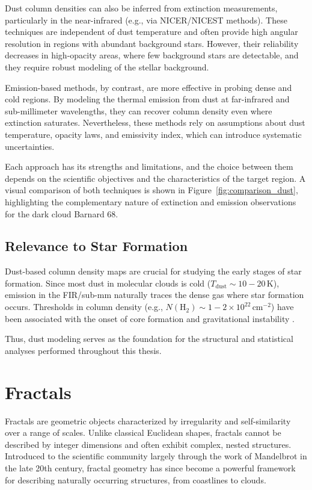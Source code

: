 Dust column densities can also be inferred from extinction measurements, particularly in the near-infrared (e.g., via NICER/NICEST methods). These techniques are independent of dust temperature and often provide high angular resolution in regions with abundant background stars. However, their reliability decreases in high-opacity areas, where few background stars are detectable, and they require robust modeling of the stellar background.

Emission-based methods, by contrast, are more effective in probing dense and cold regions. By modeling the thermal emission from dust at far-infrared and sub-millimeter wavelengths, they can recover column density even where extinction saturates. Nevertheless, these methods rely on assumptions about dust temperature, opacity laws, and emissivity index, which can introduce systematic uncertainties.

Each approach has its strengths and limitations, and the choice between them depends on the scientific objectives and the characteristics of the target region. A visual comparison of both techniques is shown in Figure~\ref{fig:comparison_dust}, highlighting the complementary nature of extinction and emission observations for the dark cloud Barnard 68.

\subsection{Relevance to Star Formation}

Dust-based column density maps are crucial for studying the early stages of star formation. Since most dust in molecular clouds is cold ($T_\mathrm{dust} \sim 10{-}20\,\mathrm{K}$), emission in the FIR/sub-mm naturally traces the dense gas where star formation occurs. Thresholds in column density (e.g., $N(\mathrm{H}_2) \sim 1{-}2 \times 10^{22}\,\mathrm{cm}^{-2}$) have been associated with the onset of core formation and gravitational instability \cite{lada2010star}.

Thus, dust modeling serves as the foundation for the structural and statistical analyses performed throughout this thesis.

\section{Fractals}

Fractals are geometric objects characterized by irregularity and self-similarity over a range of scales. Unlike classical Euclidean shapes, fractals cannot be described by integer dimensions and often exhibit complex, nested structures. Introduced to the scientific community largely through the work of Mandelbrot in the late 20th century, fractal geometry has since become a powerful framework for describing naturally occurring structures, from coastlines to clouds.

